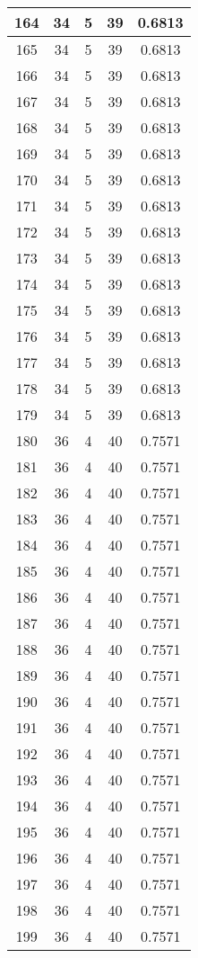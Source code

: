 \documentclass[letterpaper, 12pt]{article}
\begin{document}
\begin{longtable}{|c|c|c|c|c|}
\hline
164 & 34 & 5 & 39 & 0.6813 \\
\hline
165 & 34 & 5 & 39 & 0.6813 \\
\hline
166 & 34 & 5 & 39 & 0.6813 \\
\hline
167 & 34 & 5 & 39 & 0.6813 \\
\hline
168 & 34 & 5 & 39 & 0.6813 \\
\hline
169 & 34 & 5 & 39 & 0.6813 \\
\hline
170 & 34 & 5 & 39 & 0.6813 \\
\hline
171 & 34 & 5 & 39 & 0.6813 \\
\hline
172 & 34 & 5 & 39 & 0.6813 \\
\hline
173 & 34 & 5 & 39 & 0.6813 \\
\hline
174 & 34 & 5 & 39 & 0.6813 \\
\hline
175 & 34 & 5 & 39 & 0.6813 \\
\hline
176 & 34 & 5 & 39 & 0.6813 \\
\hline
177 & 34 & 5 & 39 & 0.6813 \\
\hline
178 & 34 & 5 & 39 & 0.6813 \\
\hline
179 & 34 & 5 & 39 & 0.6813 \\
\hline
180 & 36 & 4 & 40 & 0.7571 \\
\hline
181 & 36 & 4 & 40 & 0.7571 \\
\hline
182 & 36 & 4 & 40 & 0.7571 \\
\hline
183 & 36 & 4 & 40 & 0.7571 \\
\hline
184 & 36 & 4 & 40 & 0.7571 \\
\hline
185 & 36 & 4 & 40 & 0.7571 \\
\hline
186 & 36 & 4 & 40 & 0.7571 \\
\hline
187 & 36 & 4 & 40 & 0.7571 \\
\hline
188 & 36 & 4 & 40 & 0.7571 \\
\hline
189 & 36 & 4 & 40 & 0.7571 \\
\hline
190 & 36 & 4 & 40 & 0.7571 \\
\hline
191 & 36 & 4 & 40 & 0.7571 \\
\hline
192 & 36 & 4 & 40 & 0.7571 \\
\hline
193 & 36 & 4 & 40 & 0.7571 \\
\hline
194 & 36 & 4 & 40 & 0.7571 \\
\hline
195 & 36 & 4 & 40 & 0.7571 \\
\hline
196 & 36 & 4 & 40 & 0.7571 \\
\hline
197 & 36 & 4 & 40 & 0.7571 \\
\hline
198 & 36 & 4 & 40 & 0.7571 \\
\hline
199 & 36 & 4 & 40 & 0.7571 \\
\hline
\end{longtable}
\end{document}
